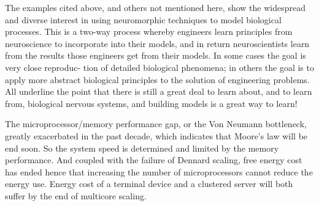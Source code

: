 


The examples cited above, and others not mentioned
here, show the widespread and diverse interest in using
neuromorphic techniques to model biological processes. This
is a two-way process whereby engineers learn principles from
neuroscience to incorporate into their models, and in return
neuroscientists learn from the results those engineers get from
their models. In some cases the goal is very close reproduc-
tion of detailed biological phenomena; in others the goal is to
apply more abstract biological principles to the solution of
engineering problems. All underline the point that there is still
a great deal to learn about, and to learn from, biological
nervous systems, and building models is a great way to learn!

The microprocessor/memory performance gap, or the Von Neumann bottleneck, greatly exacerbated in the past decade, which indicates that Moore's law will be end soon.
So the system speed is determined and limited by the memory performance.
And coupled with the failure of Dennard scaling, free energy cost has ended hence that increasing the number of microprocessors cannot reduce the energy use. 
Energy cost of a terminal device and a clustered server will both suffer by the end of multicore scaling.


